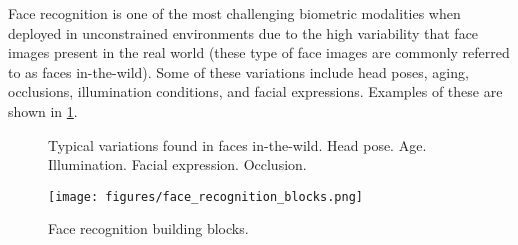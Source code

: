 \documentclass[conference]{IEEEtran}
\begin{document}
Face recognition is one of the most challenging biometric modalities when deployed in unconstrained environments due to the high variability that face images present in the real world (these type of face images are commonly referred to as faces in-the-wild). Some of these variations include head poses, aging, occlusions, illumination conditions, and facial expressions. Examples of these are shown in \cref{fig:face_variations}.

\begin{figure}[tb]
    \centering
    \hspace{0.038\linewidth}
    \par\medskip
    \hspace{0.038\linewidth}
    \hspace{0.038\linewidth}
    \caption{Typical variations found in faces in-the-wild.  Head pose.  Age.  Illumination.  Facial expression.  Occlusion.}
    \label{fig:face_variations}
\end{figure}

\begin{figure*}[tb]
    \centering
    \texttt{[image: figures/face\_recognition\_blocks.png]}
    \caption{Face recognition building blocks.}
    \label{fig:face_recognition_blocks}
\end{figure*}
\end{document}
